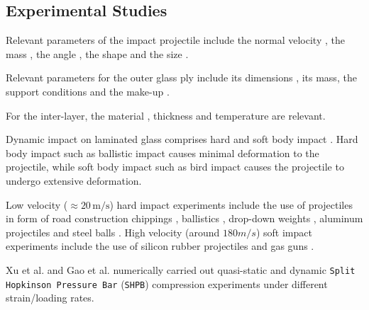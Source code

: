 \documentclass[format=acmsmall, 12pt, screen=true, review=false]{acmart}
\begin{document}


\subsection{Experimental Studies}

Relevant parameters of the impact projectile include the normal velocity \cite{Gra98, Kur14, Dar13, Wu14}, the mass \cite{Kur14, Dar13}, the angle \cite{Gra98, Kur14, Dar13}, the shape \cite{Dar13} and the size \cite{Wu14}.

\bigbreak
Relevant parameters for the outer glass ply include its dimensions \cite{Wan18}, its mass, the support conditions \cite{Wan18} and the make-up \cite{Wan18}.

\bigbreak
For the inter-layer, the material \cite{Moh18, Wan18, Mon04}, thickness \cite{Ji98, Kur14, Wan18} and temperature \cite{Moh18, Zha19} are relevant.

\bigbreak
Dynamic impact on laminated glass comprises hard and soft body impact \cite{Moh17}. Hard body impact such as ballistic impact \cite{Bra10} causes minimal deformation to the projectile, while soft body impact such as bird impact \cite{Moh17} causes the projectile to undergo extensive deformation.

\bigbreak
Low velocity ($\approx 20\,\mathrm{m}/\mathrm{s}$) hard impact experiments include the use of projectiles in form of road construction chippings \cite{Gra98}, ballistics \cite{Mon04}, drop-down weights \cite{Che15, Mil12, Wan18}, aluminum projectiles \cite{Mil12} and steel balls \cite{Beh99, Flo98, Wan18}. High velocity (around $180 m/s$) soft impact experiments include the use of silicon rubber projectiles \cite{Moh17} and gas guns \cite{Moh18}.

\bigbreak
Xu et al. \cite{Xu11} and Gao et al. \cite{Gao14} numerically carried out quasi-static and dynamic \texttt{Split Hopkinson Pressure Bar} (\texttt{SHPB}) compression experiments under different strain/loading rates. 
\end{document}
